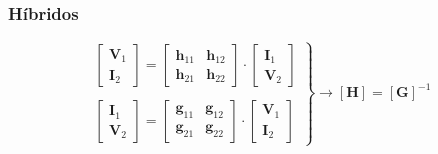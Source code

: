 \subsubsection{Híbridos}
\label{sec:org34b878b}
\[
  \left.
    \begin{array}{l}
  \left[
    \begin{array}{c}
      \mathbf{V}_1\\
      \mathbf{I}_2
    \end{array}
  \right] =
  \left[
    \begin{array}{cc}
      \mathbf{h}_{11} & \mathbf{h}_{12}\\
      \mathbf{h}_{21} & \mathbf{h}_{22}
    \end{array}
  \right] \cdot
  \left[
    \begin{array}{c}
      \mathbf{I}_1\\
      \mathbf{V}_2
    \end{array}
      \right]
      \\ \\
  \left[
    \begin{array}{c}
      \mathbf{I}_1\\
      \mathbf{V}_2
    \end{array}
  \right] =
  \left[
    \begin{array}{cc}
      \mathbf{g}_{11} & \mathbf{g}_{12}\\
      \mathbf{g}_{21} & \mathbf{g}_{22}
    \end{array}
  \right] \cdot
  \left[
    \begin{array}{c}
      \mathbf{V}_1\\
      \mathbf{I}_2
    \end{array}
      \right]
      \end{array}
    \right\}
      \rightarrow
      \boxed{[\mathbf{H}] = [\mathbf{G}]^{-1}}
    \]
